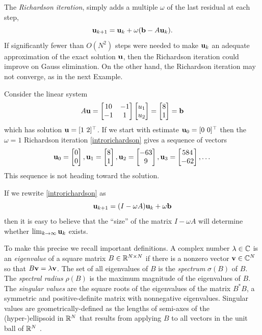 The \emph{Richardson iteration}, simply adds a multiple $\omega$ of the last residual at each step,
\begin{equation}
\mathbf{u}_{k+1} = \mathbf{u}_k + \omega (\mathbf{b} - A \mathbf{u}_k).  \label{introrichardson}
\end{equation}
If significantly fewer than $O(N^2)$ steps were needed to make $\mathbf{u}_k$ an adequate approximation of the exact solution $\mathbf{u}$, then the Richardson iteration could improve on Gauss elimination.  On the other hand, the Richardson iteration may not converge, as in the next Example.

\medskip\noindent\hrulefill
\begin{example} Consider the linear system
\begin{equation}
A \mathbf{u}
= \begin{bmatrix}
10 & -1 \\ -1 & 1
\end{bmatrix}
\begin{bmatrix} u_1 \\ u_2 \end{bmatrix}
= \begin{bmatrix} 8 \\ 1 \end{bmatrix}
= \mathbf{b}
 \label{introexample}
\end{equation}
which has solution $\mathbf{u} = [1\,\, 2]^\top$.  If we start with estimate $\mathbf{u}_0 = [0\,\, 0]^\top$ then the $\omega=1$ Richardson iteration \eqref{introrichardson} gives a sequence of vectors %
\begin{equation}
{\mathbf{u}}_{0} = \begin{bmatrix} 0 \\ 0 \end{bmatrix}, {\mathbf{u}}_{1} = \begin{bmatrix} 8 \\ 1 \end{bmatrix}, {\mathbf{u}}_{2} = \begin{bmatrix} -63 \\ 9 \end{bmatrix}, {\mathbf{u}}_{3} = \begin{bmatrix} 584 \\ -62 \end{bmatrix}, \dots
\end{equation}
This sequence is not heading toward the solution.
\end{example}
\noindent\hrulefill

\medskip
If we rewrite \eqref{introrichardson} as
\begin{equation}
\mathbf{u}_{k+1} = (I - \omega A) \mathbf{u}_k + \omega \mathbf{b}  \label{introrewriterichardson}
\end{equation}
then it is easy to believe that the ``size'' of the matrix $I-\omega A$ will determine whether $\lim_{k\to\infty} \mathbf{u}_k$ exists.

To make this precise we recall important definitions.  A complex number $\lambda \in \mathbb{C}$ is an \emph{eigenvalue} of a square matrix $B\in\mathbb{R}^{N\times N}$ if there is a nonzero vector $\mathbf{v}\in\mathbb{C}^N$ so that $B \mathbf{v} = \lambda \mathbf{v}$.  The set of all eigenvalues of $B$ is the \emph{spectrum} $\sigma(B)$ of $B$.  The \emph{spectral radius} $\rho(B)$ is the maximum magnitude of the eigenvalues of $B$.  The \emph{singular values} are the square roots of the eigenvalues of the matrix $B^*B$, a symmetric and positive-definite matrix with nonnegative eigenvalues.  Singular values are geometrically-defined as the lengths of semi-axes of the (hyper-)ellipsoid in $\mathbb{R}^N$ that results from applying $B$ to all vectors in the unit ball of $\mathbb{R}^N$ \citep{TrefethenBau1997}.

